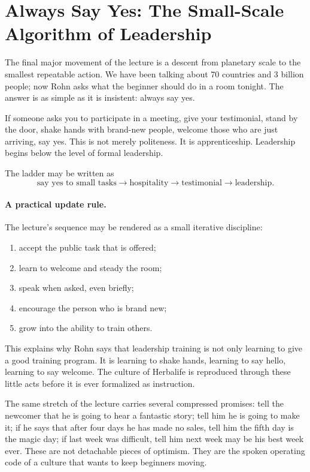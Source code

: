 \section{Always Say Yes: The Small-Scale Algorithm of Leadership}

The final major movement of the lecture is a descent from planetary scale to the smallest repeatable action. We have been talking about 70 countries and 3 billion people; now Rohn asks what the beginner should do in a room tonight. The answer is as simple as it is insistent: always say yes.

If someone asks you to participate in a meeting, give your testimonial, stand by the door, shake hands with brand-new people, welcome those who are just arriving, say yes. This is not merely politeness. It is apprenticeship. Leadership begins below the level of formal leadership.

The ladder may be written as
\begin{equation}
\text{say yes to small tasks} \to \text{hospitality} \to \text{testimonial} \to \text{leadership}.
\end{equation}

\paragraph{A practical update rule.}
The lecture's sequence may be rendered as a small iterative discipline:
\begin{enumerate}
\item accept the public task that is offered;
\item learn to welcome and steady the room;
\item speak when asked, even briefly;
\item encourage the person who is brand new;
\item grow into the ability to train others.
\end{enumerate}

This explains why Rohn says that leadership training is not only learning to give a good training program. It is learning to shake hands, learning to say hello, learning to say welcome. The culture of Herbalife is reproduced through these little acts before it is ever formalized as instruction.

The same stretch of the lecture carries several compressed promises: tell the newcomer that he is going to hear a fantastic story; tell him he is going to make it; if he says that after four days he has made no sales, tell him the fifth day is the magic day; if last week was difficult, tell him next week may be his best week ever. These are not detachable pieces of optimism. They are the spoken operating code of a culture that wants to keep beginners moving.

